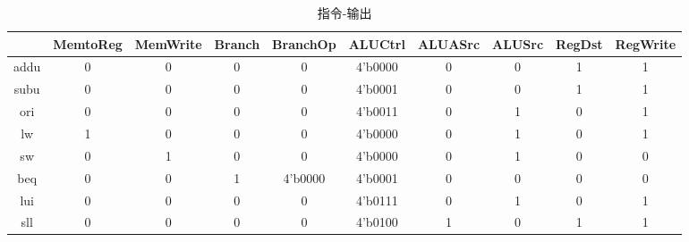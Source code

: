 \documentclass[UTF8]{ctexart}
\begin{document}
\begin{table}[H]
	\centering
	\begin{threeparttable}
		\caption{指令-输出}
		\begin{tabular}{|c|c|c|c|c|c|c|c|c|c|}
			\hline
			\rowcolor{mypink}
			\diagbox{\textbf{Inst}}{\textbf{Output}} & \textbf{MemtoReg} & \textbf{MemWrite} & \textbf{Branch} & \textbf{BranchOp} & \textbf{ALUCtrl} & \textbf{ALUASrc} & \textbf{ALUSrc} & \textbf{RegDst} & \textbf{RegWrite} \\
			\hline
			addu                                     & 0                 & 0                 & 0               & 0                 & 4'b0000          & 0                & 0               & 1               & 1                 \\
			\hline
			subu                                     & 0                 & 0                 & 0               & 0                 & 4'b0001          & 0                & 0               & 1               & 1                 \\
			\hline
			ori                                      & 0                 & 0                 & 0               & 0                 & 4'b0011          & 0                & 1               & 0               & 1                 \\
			\hline
			lw                                       & 1                 & 0                 & 0               & 0                 & 4'b0000          & 0                & 1               & 0               & 1                 \\
			\hline
			sw                                       & 0                 & 1                 & 0               & 0                 & 4'b0000          & 0                & 1               & 0               & 0                 \\
			\hline
			beq                                      & 0                 & 0                 & 1               & 4'b0000           & 4'b0001          & 0                & 0               & 0               & 0                 \\
			\hline
			lui                                      & 0                 & 0                 & 0               & 0                 & 4'b0111          & 0                & 1               & 0               & 1                 \\
			\hline
			sll                                      & 0                 & 0                 & 0               & 0                 & 4'b0100          & 1                & 0               & 1               & 1                 \\

\end{tabular}
\end{threeparttable}
\end{table}
\end{document}
